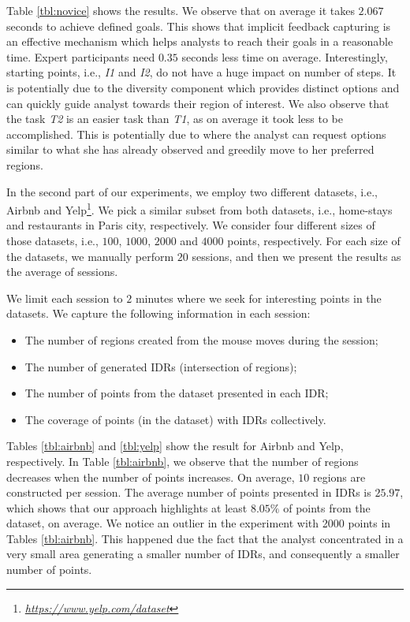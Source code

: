 \documentclass[sigconf,edbt]{acmart-edbt2019}
\begin{document}
\vspace{2pt}
Table \ref{tbl:novice} shows the results. We observe that on average it takes $2.067$ seconds to achieve defined goals. This shows that implicit feedback capturing is an effective mechanism which helps analysts to reach their goals in a reasonable time. Expert participants need $0.35$ seconds less time on average. Interestingly, starting points, i.e., {\em I1} and {\em I2}, do not have a huge impact on number of steps. It is potentially due to the diversity component which provides distinct options and can quickly guide analyst towards their region of interest. We also observe that the task {\em T2} is an easier task than {\em T1}, as on average it took less to be accomplished. This is potentially due to  where the analyst can request options similar to what she has already observed and greedily move to her preferred regions.

\vspace{2pt}
In the second part of our experiments, we employ two different datasets, i.e., \textsf{Airbnb} and \textsf{Yelp}\footnote{\it \url{https://www.yelp.com/dataset}}. We pick a similar subset from both datasets, i.e., home-stays and restaurants in Paris city, respectively. We consider four different sizes of those datasets, i.e., $100$, $1000$, $2000$ and $4000$ points, respectively. For each size of the datasets, we manually perform $20$ sessions, and then we present the results as the average of sessions.

\vspace{2pt}
We limit each session to $2$ minutes where we seek for interesting points in the datasets. We capture the following information in each session:

\begin{itemize}[leftmargin=*]
  \item The number of regions created from the mouse moves during the session;
  \item The number of generated IDRs (intersection of regions);
  \item The number of points from the dataset presented in each IDR;
  \item The coverage of points (in the dataset) with IDRs collectively.
\end{itemize}  

\vspace{2pt}
Tables \ref{tbl:airbnb} and \ref{tbl:yelp} show the result for \textsf{Airbnb} and \textsf{Yelp}, respectively. In Table \ref{tbl:airbnb}, we observe that the number of regions decreases when the number of points increases. On average, $10$ regions are constructed per session. The average number of points presented in IDRs is $25.97$, which shows that our approach highlights at least $8.05\%$ of points from the dataset, on average.
We notice an outlier in the experiment with 2000 points in Tables \ref{tbl:airbnb}. This happened due the fact that  the analyst concentrated in a very small area generating a smaller number of IDRs, and consequently a smaller number of points.
 
\end{document}

